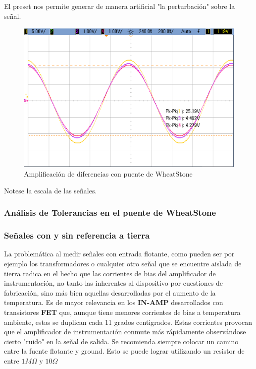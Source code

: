 El preset nos permite generar de manera artificial "la perturbación" sobre la señal.

\begin{figure}[H]
	\centering
	\includegraphics[height=0.3\textheight]{./ImagenesDeOsciloscopio/WheatStone1tierra1c1R.png}
	\caption{Amplificación de diferencias con puente de WheatStone}
\end{figure}
Notese la escala de las señales.
\subsubsection{Análisis de Tolerancias en el puente de WheatStone}


\subsubsection{Señales con y sin referencia a tierra}
La problemática al medir señales con entrada flotante, como pueden ser por ejemplo los transformadores o cualquier otro señal que se encuentre aislada de tierra radica en el hecho que las corrientes de bias del amplificador de instrumentación, no tanto las inherentes al dispositivo por cuestiones de fabricación, sino más bien aquellas desarrolladas por el aumento de la temperatura. Es de mayor relevancia en los \textbf{IN-AMP} desarrollados con transistores \textbf{FET} que, aunque tiene menores corrientes de bias a temperatura ambiente, estas se duplican cada 11 grados centigrados. Estas corrientes provocan que el amplificador de instrumentación conmute más rápidamente observándose cierto "ruido" en la señal de salida. Se recomienda siempre colocar un camino entre la fuente flotante y ground. Esto se puede lograr utilizando un resistor de entre $1M\Omega$ y  $10\Omega$


